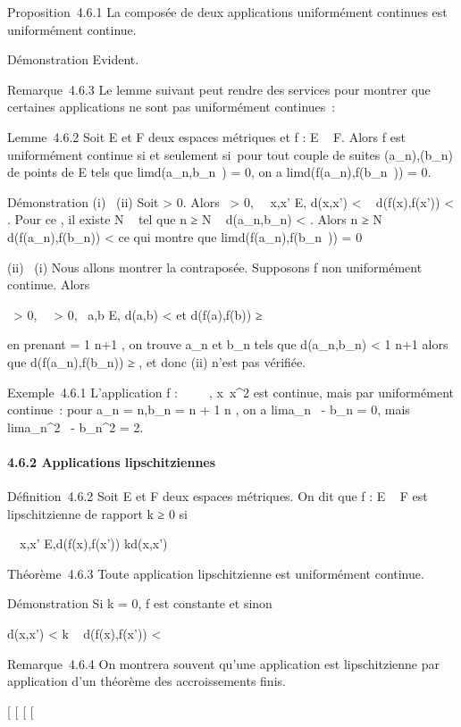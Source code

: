 \documentclass[]{article}
\begin{document}
Proposition~4.6.1 La composée de deux applications uniformément
continues est uniformément continue.

Démonstration Evident.

Remarque~4.6.3 Le lemme suivant peut rendre des services pour montrer
que certaines applications ne sont pas uniformément continues~:

Lemme~4.6.2 Soit E et F deux espaces métriques et f : E \rightarrow~ F. Alors f est
uniformément continue si et seulement si~pour tout couple de suites
(a_n),(b_n) de points de E tels que
limd(a_n,b_n~) = 0, on a
limd(f(a_n),f(b_n~)) = 0.

Démonstration (i) \rigtharrow~(ii) Soit \epsilon \textgreater{} 0. Alors
\exists~\eta \textgreater{} 0,\quad
\forall~~x,x' \in E, d(x,x') \textless{} \eta \rigtharrow~
d(f(x),f(x')) \textless{} \epsilon. Pour ce \eta, il existe N \in {}~ tel que n ≥ N \rigtharrow~
d(a_n,b_n) \textless{} \eta. Alors n ≥ N \rigtharrow~
d(f(a_n),f(b_n)) \textless{} \epsilon ce qui montre que
limd(f(a_n),f(b_n~)) = 0

(ii) \rigtharrow~(i) Nous allons montrer la contraposée. Supposons f non
uniformément continue. Alors

\exists~\epsilon \textgreater{} 0,
\forall~~\eta \textgreater{} 0,\quad
\exists~a,b \in E, d(a,b) \textless{}
\eta\text et d(f(a),f(b)) ≥ \epsilon

en prenant \eta = 1 \over n+1 , on trouve a_n
et b_n tels que d(a_n,b_n) \textless{} 1
\over n+1 alors que d(f(a_n),f(b_n))
≥ \epsilon, et donc (ii) n'est pas vérifiée.

Exemple~4.6.1 L'application f : ~ \rightarrow~ ~,
x\mapsto~x^2 est continue, mais par
uniformément continue~: pour a_n = n,b_n = n + 1
\over n , on a
lima_n~ -
b_n = 0, mais
lima_n^2~ -
b_n^2 = 2.

\paragraph{4.6.2 Applications lipschitziennes}

Définition~4.6.2 Soit E et F deux espaces métriques. On dit que f : E \rightarrow~
F est lipschitzienne de rapport k ≥ 0 si

\forall~~x,x' \in E,\quad d(f(x),f(x')) \leq
kd(x,x')

Théorème~4.6.3 Toute application lipschitzienne est uniformément
continue.

Démonstration Si k = 0, f est constante et sinon

d(x,x') \textless{} \epsilon \over k \rigtharrow~ d(f(x),f(x'))
\textless{} \epsilon

Remarque~4.6.4 On montrera souvent qu'une application est lipschitzienne
par application d'un théorème des accroissements finis.

{[}
{[}
{[}
{[}
\end{document}
